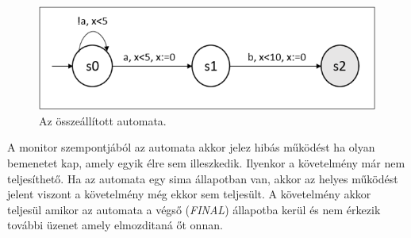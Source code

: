 \begin{figure}[!ht]
    \centering
    \includegraphics[width=130mm, keepaspectratio]{figures/9abra.png}
    \caption{Az összeállított automata.}
    \label{created_automaton}
\end{figure}

A monitor szempontjából az automata akkor jelez hibás működést ha olyan bemenetet kap, amely egyik élre sem illeszkedik.
Ilyenkor a követelmény már nem teljesíthető.
Ha az automata egy sima állapotban van, akkor az helyes működést jelent viszont a követelmény még ekkor sem teljesült.
A követelmény akkor teljesül amikor az automata a végső (\textit{FINAL}) állapotba kerül és nem érkezik további üzenet amely elmozditaná őt onnan.